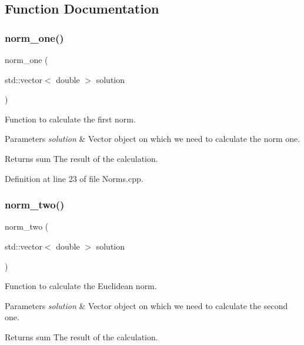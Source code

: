 \subsection{Function Documentation}
\mbox{\label{_norms_8cpp_a8a5dd7ae3578ecdb533ae37b7dd00086}} 
\subsubsection{norm\+\_\+one()}
{\footnotesize\ttfamily norm\+\_\+one (\begin{DoxyParamCaption}\item[{std\+::vector$<$ double $>$}]{solution }\end{DoxyParamCaption})}



Function to calculate the first norm. 


\begin{DoxyParams}{Parameters}
{\em solution} & Vector object on which we need to calculate the norm one. \\
\hline
\end{DoxyParams}
\begin{DoxyReturn}{Returns}
sum The result of the calculation. 
\end{DoxyReturn}


Definition at line 23 of file Norms.\+cpp.

\mbox{\label{_norms_8cpp_acde0d182617c91cb757a10b1bb2281f1}} 
\subsubsection{norm\+\_\+two()}
{\footnotesize\ttfamily norm\+\_\+two (\begin{DoxyParamCaption}\item[{std\+::vector$<$ double $>$}]{solution }\end{DoxyParamCaption})}



Function to calculate the Euclidean norm. 


\begin{DoxyParams}{Parameters}
{\em solution} & Vector object on which we need to calculate the second one. \\
\hline
\end{DoxyParams}
\begin{DoxyReturn}{Returns}
sum The result of the calculation. 
\end{DoxyReturn}


